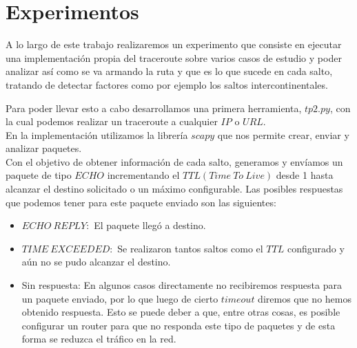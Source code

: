 \section{Experimentos}


A lo largo de este trabajo realizaremos un experimento que consiste en ejecutar una implementación propia del traceroute sobre varios casos de estudio y poder analizar así como se va armando la ruta y que es lo que sucede en cada salto, tratando de detectar factores como por ejemplo los saltos intercontinentales.

Para poder llevar esto a cabo desarrollamos una primera herramienta, $tp2.py$, con la cual podemos realizar un traceroute a cualquier $IP$ o $URL$. \\
En la implementación utilizamos la librería $scapy$ que nos permite crear, enviar y analizar paquetes. \\
Con el objetivo de obtener información de cada salto, generamos y envíamos un paquete de tipo $ECHO$ incrementando el $TTL (Time\ To\ Live)$ desde 1 hasta alcanzar el destino solicitado o un máximo configurable. Las posibles respuestas que podemos tener para este paquete enviado son las siguientes:
\begin{itemize}
	\item $ECHO\ REPLY:$ El paquete llegó a destino. 
	\item $TIME\ EXCEEDED:$ Se realizaron tantos saltos como el $TTL$ configurado y aún no se pudo alcanzar el destino.
	\item Sin respuesta: En algunos casos directamente no recibiremos respuesta para un paquete enviado, por lo que luego de cierto $timeout$ diremos que no hemos obtenido respuesta. Esto se puede deber a que, entre otras cosas, es posible configurar un router para que no responda este tipo de paquetes y de esta forma se reduzca el tráfico en la red.
\end{itemize}

